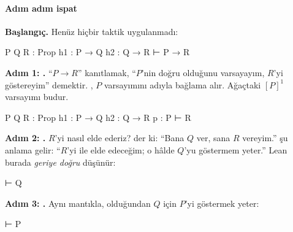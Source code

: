 \begin{center}
\end{center}

\paragraph{Adım adım ispat}

\noindent\textbf{Başlangıç.} Henüz hiçbir taktik uygulanmadı:
\begin{hedefdurumu}
P Q R : Prop
h1 : P → Q
h2 : Q → R
⊢ P → R
\end{hedefdurumu}

\noindent\textbf{Adım 1: .}
``$P \to R$'' kanıtlamak, ``$P$'nin doğru olduğunu varsayayım, $R$'yi
göstereyim'' demektir. , $P$ varsayımını 
adıyla bağlama alır. Ağaçtaki $[P]^1$ varsayımı budur.
\begin{hedefdurumu}
P Q R : Prop
h1 : P → Q
h2 : Q → R
p : P
⊢ R
\end{hedefdurumu}

\noindent\textbf{Adım 2: .}
$R$'yi nasıl elde ederiz?  der ki: ``Bana $Q$ ver, sana $R$
vereyim.''  şu anlama gelir: ``$R$'yi  ile
elde edeceğim; o hâlde $Q$'yu göstermem yeter.'' Lean burada
\emph{geriye doğru} düşünür:
\begin{hedefdurumu}
⊢ Q
\end{hedefdurumu}

\noindent\textbf{Adım 3: .}
Aynı mantıkla,  olduğundan $Q$ için $P$'yi göstermek yeter:
\begin{hedefdurumu}
⊢ P
\end{hedefdurumu}


